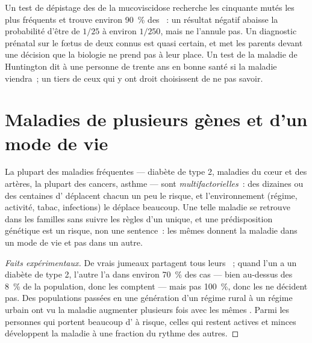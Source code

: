 \begin{example}\label{ex:g11:genes-and-disease:testsays}
Un test de dépistage des  de la mucoviscidose recherche les
cinquante  mutés les plus fréquents et trouve environ 90~\% des
~: un résultat négatif abaisse la probabilité d'être  de
$1/25$ à environ $1/250$, mais ne l'annule pas. Un diagnostic prénatal
sur le fœtus de deux  connus est quasi certain, et met les
parents devant une décision que la biologie ne prend pas à leur place.
Un test de la maladie de Huntington dit à une personne de trente ans en
bonne santé si la maladie viendra~; un tiers de ceux qui y ont droit
choisissent de ne pas savoir.
\end{example}

\section{Maladies de plusieurs gènes et d'un mode de vie}

\begin{proposition}\label{prop:g11:genes-and-disease:multifactorial}
La plupart des maladies fréquentes --- diabète de type 2, maladies du
cœur et des artères, la plupart des cancers, asthme --- sont
\emph{multifactorielles}~: des dizaines
ou des centaines d' déplacent chacun un peu le risque, et
l'environnement (régime, activité, tabac, infections) le déplace
beaucoup. Une telle maladie se retrouve dans les familles sans suivre
les règles d'un  unique, et une prédisposition génétique est un
risque, non une sentence~: les mêmes  donnent la maladie dans un
mode de vie et pas dans un autre.
\end{proposition}
\begin{proof}[Faits expérimentaux]
De vrais jumeaux partagent tous leurs ~; quand l'un a un diabète
de type 2, l'autre l'a dans environ 70~\% des cas --- bien au-dessus des
8~\% de la population, donc les  comptent --- mais pas 100~\%,
donc les  ne décident pas. Des populations passées en une
génération d'un régime rural à un régime urbain ont vu la maladie
augmenter plusieurs fois avec les mêmes . Parmi les personnes qui
portent beaucoup d' à risque, celles qui restent actives et
minces développent la maladie à une fraction du rythme des autres.
\end{proof}

